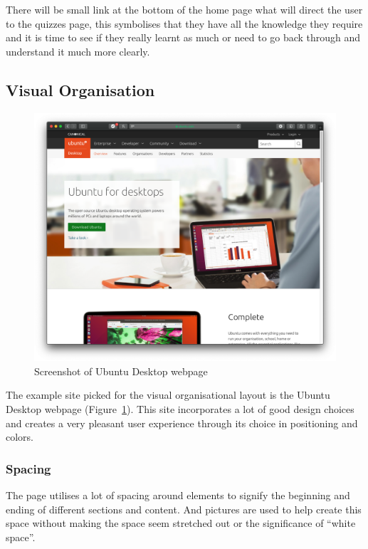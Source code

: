 There will be small link at the bottom of the home page what will direct the user to the quizzes page, this symbolises that they have all the knowledge they require and it is time to see if they really learnt as much or need to go back through and understand it much more clearly.


\subsection{Visual Organisation}

\begin{figure}
	\centering
	\includegraphics[width=\linewidth]{ubuntu}
	\caption{Screenshot of Ubuntu Desktop webpage}\label{fig:ubuntu}
\end{figure}

The example site picked for the visual organisational layout is the Ubuntu Desktop webpage (Figure~\ref{fig:ubuntu}). This site incorporates a lot of good design choices and creates a very pleasant user experience through its choice in positioning and colors.

\subsubsection{Spacing}
The page utilises a lot of spacing around elements to signify the beginning and ending of different sections and content. And pictures are used to help create this space without making the space seem stretched out or the significance of ``white space''.


